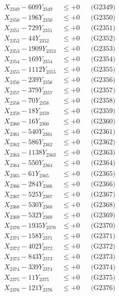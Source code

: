 \documentclass[a4paper,10pt]{article}
\begin{document}
{\begin{align}
X_{2349} - 609Y_{2349} &\leq +0 && \text{(G2349)} \\
X_{2350} - 196Y_{2350} &\leq +0 && \text{(G2350)} \\
\allowbreak
X_{2351} - 729Y_{2351} &\leq +0 && \text{(G2351)} \\
X_{2352} - 44Y_{2352} &\leq +0 && \text{(G2352)} \\
X_{2353} - 1909Y_{2353} &\leq +0 && \text{(G2353)} \\
X_{2354} - 169Y_{2354} &\leq +0 && \text{(G2354)} \\
X_{2355} - 1112Y_{2355} &\leq +0 && \text{(G2355)} \\
X_{2356} - 239Y_{2356} &\leq +0 && \text{(G2356)} \\
X_{2357} - 379Y_{2357} &\leq +0 && \text{(G2357)} \\
X_{2358} - 70Y_{2358} &\leq +0 && \text{(G2358)} \\
X_{2359} - 18Y_{2359} &\leq +0 && \text{(G2359)} \\
X_{2360} - 16Y_{2360} &\leq +0 && \text{(G2360)} \\
\allowbreak
X_{2361} - 540Y_{2361} &\leq +0 && \text{(G2361)} \\
X_{2362} - 586Y_{2362} &\leq +0 && \text{(G2362)} \\
X_{2363} - 1138Y_{2363} &\leq +0 && \text{(G2363)} \\
X_{2364} - 550Y_{2364} &\leq +0 && \text{(G2364)} \\
X_{2365} - 61Y_{2365} &\leq +0 && \text{(G2365)} \\
X_{2366} - 284Y_{2366} &\leq +0 && \text{(G2366)} \\
X_{2367} - 525Y_{2367} &\leq +0 && \text{(G2367)} \\
X_{2368} - 530Y_{2368} &\leq +0 && \text{(G2368)} \\
X_{2369} - 532Y_{2369} &\leq +0 && \text{(G2369)} \\
X_{2370} - 1935Y_{2370} &\leq +0 && \text{(G2370)} \\
\allowbreak
X_{2371} - 158Y_{2371} &\leq +0 && \text{(G2371)} \\
X_{2372} - 402Y_{2372} &\leq +0 && \text{(G2372)} \\
X_{2373} - 843Y_{2373} &\leq +0 && \text{(G2373)} \\
X_{2374} - 339Y_{2374} &\leq +0 && \text{(G2374)} \\
X_{2375} - 11Y_{2375} &\leq +0 && \text{(G2375)} \\
X_{2376} - 121Y_{2376} &\leq +0 && \text{(G2376)} \\

\end{align}}
\end{document}
